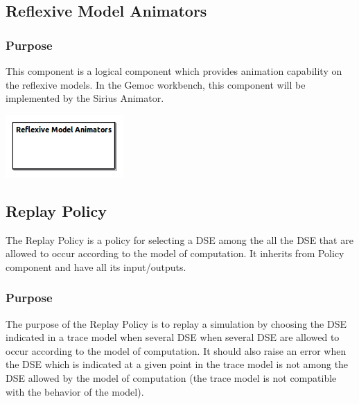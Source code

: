 \documentclass{gemoc} %
\begin{document}
\subsection{Reflexive Model Animators}


\subsubsection{Purpose}
This component is a logical component which provides animation capability on the reflexive models. In the Gemoc workbench, this component will be implemented by the Sirius Animator.

\begin{center}
\includegraphics*[trim=0.0cm 0.0cm 0cm 0.0cm, clip=true]{../images/generated/Generated_Reflexive_Model_Animators.png}
\end{center}




\subsection{Replay Policy}
The Replay Policy is a policy for selecting a DSE among the all the DSE that are allowed to occur according to the model of computation.
It inherits from Policy component and have all its input/outputs.

\subsubsection{Purpose}
The purpose of the Replay Policy is to replay a simulation by choosing the DSE indicated in a trace model when several DSE when several DSE are allowed to occur according to the model of computation. It should also raise an error when the DSE which is indicated at a given point in the trace model is not among the DSE allowed by the model of computation (the trace model is not compatible with the behavior of the model).
\end{document}

